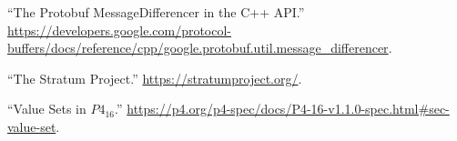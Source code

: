 \documentclass[11pt]{article}
\begin{document}
{{\begin{thebibliography}{36}
\mdbibitemlabel{{}[34]}\textquotedblleft{}The Protobuf MessageDifferencer in the C++ API.\textquotedblright{} \href{https://developers.google.com/protocol-buffers/docs/reference/cpp/google.protobuf.util.message_differencer}{{\ttfamily https://\hspace{0pt}developers.\hspace{0pt}google.\hspace{0pt}com/\hspace{0pt}protocol-\hspace{0pt}buffers/\hspace{0pt}docs/\hspace{0pt}reference/\hspace{0pt}cpp/\hspace{0pt}google.\hspace{0pt}protobuf.\hspace{0pt}util.\hspace{0pt}message\_\hspace{0pt}differencer}}.\label{protomessagedifferencer}%

\mdbibitemlabel{{}[35]}\textquotedblleft{}The Stratum Project.\textquotedblright{} \href{https://stratumproject.org/}{{\ttfamily https://\hspace{0pt}stratumproject.\hspace{0pt}org/\hspace{0pt}}}.\label{stratum}%

\mdbibitemlabel{{}[36]}\textquotedblleft{}Value Sets in $P4_{16}$.\textquotedblright{} \href{https://p4.org/p4-spec/docs/P4-16-v1.1.0-spec.html\%23sec-value-set}{{\ttfamily https://\hspace{0pt}p4.\hspace{0pt}org/\hspace{0pt}p4-\hspace{0pt}spec/\hspace{0pt}docs/\hspace{0pt}P4-\hspace{0pt}16-\hspace{0pt}v1.\hspace{0pt}1.\hspace{0pt}0-\hspace{0pt}spec.\hspace{0pt}html\#\hspace{0pt}sec-\hspace{0pt}value-\hspace{0pt}set}}.\label{p4valuesets}%
\par%
\end{thebibliography}}%
}%
\end{document}
